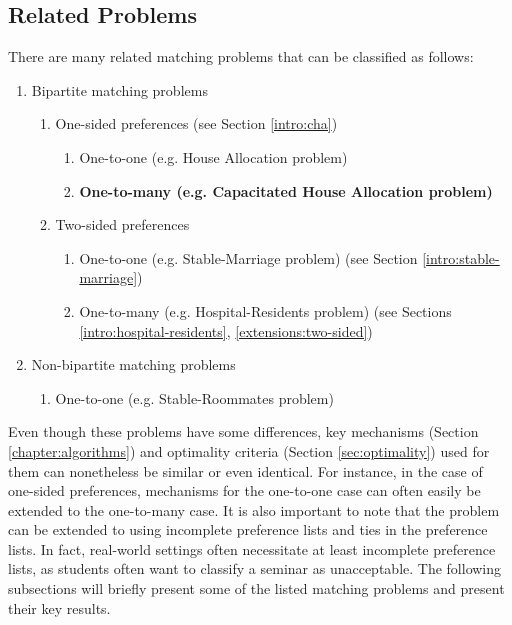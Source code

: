 \subsection{Related Problems}
There are many related matching problems that can be classified as follows:
\begin{enumerate}
    \item Bipartite matching problems
    \begin{enumerate}
        \item One-sided preferences (see Section \ref{intro:cha})
        \begin{enumerate}
            \item One-to-one (e.g. House Allocation problem)
            \item \textbf{One-to-many (e.g. Capacitated House Allocation problem)} 
        \end{enumerate}
        \item Two-sided preferences
        \begin{enumerate}
            \item One-to-one (e.g. Stable-Marriage problem) (see Section \ref{intro:stable-marriage})
            \item One-to-many (e.g. Hospital-Residents problem) (see Sections \ref{intro:hospital-residents}, \ref{extensions:two-sided})
        \end{enumerate}
    \end{enumerate}
    \item Non-bipartite matching problems 
    \begin{enumerate}
        \item One-to-one (e.g. Stable-Roommates problem)
    \end{enumerate}
\end{enumerate}
Even though these problems have some differences, key mechanisms (Section \ref{chapter:algorithms}) and optimality criteria (Section \ref{sec:optimality}) used for them can nonetheless be similar or even identical. For instance, in the case of one-sided preferences, mechanisms for the one-to-one case can often easily be extended to the one-to-many case. It is also important to note that the problem can be extended to using incomplete preference lists and ties in the preference lists. In fact, real-world settings often necessitate at least incomplete preference lists, as students often want to classify a seminar as unacceptable. The following subsections will briefly present some of the listed matching problems and present their key results.  

